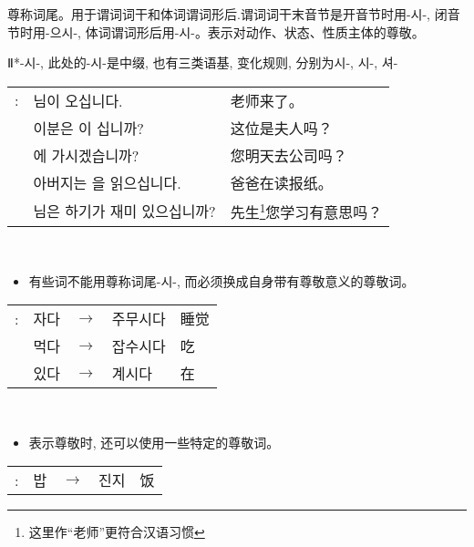 \begin{grammar}
	\begin{grammarsect}[\kr -(으){}시-]\label{grm:si}
		\begin{itemize}
			\item 尊称词尾。用于谓词词干和体词谓词形后.谓词词干末音节是开音节时用{\kr -시-}, 闭音节时用{\kr -으시-}, 体词谓词形后用{\kr -시-}。表示对动作、状态、性质主体的尊敬。
			      {\color{gray} \item Ⅱ*{\kr -시-}, 此处的{\kr -시-}是中缀, 也有三类语基, 变化规则, 分别为{\kr 시-, 시-, 셔-}}
		\end{itemize}
		\begin{tabular}{lll}
			\kr \ruby{例}{예}: & \kr \ruby{先生}{선생}님이 오십니다.                      & 老师来了。                               \\
			                 & \kr 이분은 \ruby{夫人}{부인}이 십니까?                    & 这位是夫人吗？                             \\
			                 & \kr \ruby{來日}{내일} \ruby{會社}{회사}에 가시겠습니까?       & 您明天去公司吗？                            \\
			                 & \kr 아버지는 \ruby{新聞}{신문}을 읽으십니다.                 & 爸爸在读报纸。                             \\
			                 & \kr \ruby{先生}{선생}님은 \ruby{工夫}{공부}하기가 재미 있으십니까? & 先生\footnote{这里作“老师”更符合汉语习惯}您学习有意思吗？
		\end{tabular}\\
		\begin{itemize}
			\item 有些词不能用尊称词尾{\kr -시-}, 而必须换成自身带有尊敬意义的尊敬词。
		\end{itemize}
		\begin{tabular}{lllll}
			\kr \ruby{例}{예}: & \kr 자다 & $\to$ & \kr 주무시다 & 睡觉 \\
			                 & \kr 먹다 & $\to$ & \kr 잡수시다 & 吃  \\
			                 & \kr 있다 & $\to$ & \kr 계시다  & 在
		\end{tabular}\\
		\begin{itemize}
			\item 表示尊敬时, 还可以使用一些特定的尊敬词。
		\end{itemize}
		\begin{tabular}{lllll}
			\kr \ruby{例}{예}: & \kr 밥 & $\to$ & \kr 진지          & 饭  \\

\end{tabular}
\end{grammarsect}
\end{grammar}
